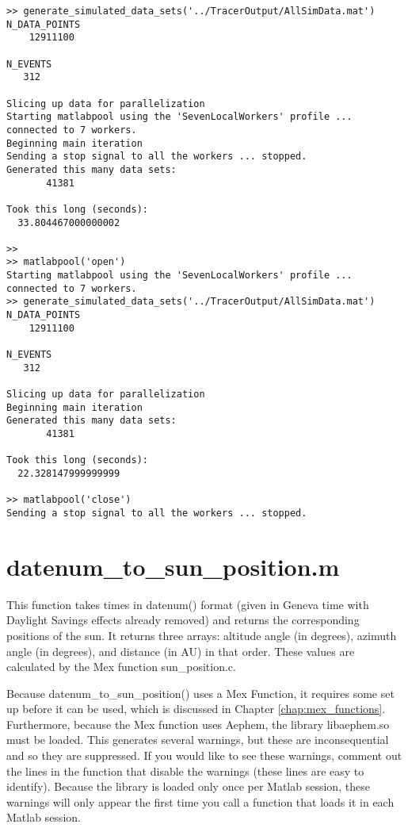 \documentclass[12pt]{report}
\begin{document}
\begin{verbatim}
>> generate_simulated_data_sets('../TracerOutput/AllSimData.mat')
N_DATA_POINTS
    12911100

N_EVENTS
   312

Slicing up data for parallelization
Starting matlabpool using the 'SevenLocalWorkers' profile ... connected to 7 workers.
Beginning main iteration
Sending a stop signal to all the workers ... stopped.
Generated this many data sets:
       41381

Took this long (seconds):
  33.804467000000002

>> 
>> matlabpool('open')
Starting matlabpool using the 'SevenLocalWorkers' profile ... connected to 7 workers.
>> generate_simulated_data_sets('../TracerOutput/AllSimData.mat')
N_DATA_POINTS
    12911100

N_EVENTS
   312

Slicing up data for parallelization
Beginning main iteration
Generated this many data sets:
       41381

Took this long (seconds):
  22.328147999999999

>> matlabpool('close')
Sending a stop signal to all the workers ... stopped.
\end{verbatim}

\section{datenum\_to\_sun\_position.m}
This function takes times in datenum() format (given in Geneva time with Daylight Savings effects already removed) and returns the corresponding positions of the sun.  It returns three arrays: altitude angle (in degrees), azimuth angle (in degrees), and distance (in AU) in that order.  These values are calculated by the Mex function sun\_position.c.  

Because datenum\_to\_sun\_position() uses a Mex Function, it requires some set up before it can be used, which is discussed in Chapter \ref{chap:mex_functions}.  Furthermore, because the Mex function uses Aephem, the library libaephem.so must be loaded.  This generates several warnings, but these are inconsequential and so they are suppressed.  If you would like to see these warnings, comment out the lines in the function that disable the warnings (these lines are easy to identify).  Because the library is loaded only once per Matlab session, these warnings will only appear the first time you call a function that loads it in each Matlab session.
\end{document}
